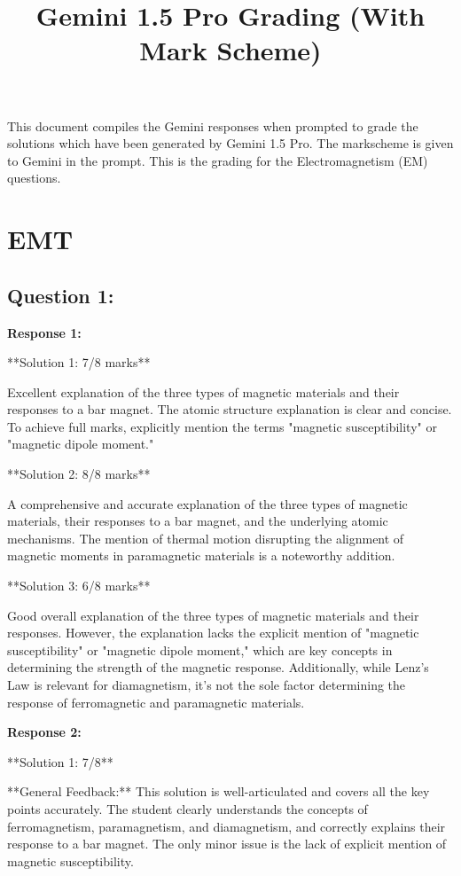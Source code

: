 \documentclass[a4paper,11pt]{article}
\begin{document}
    
\title{Gemini 1.5 Pro Grading (With Mark Scheme)}

\maketitle

This document compiles the Gemini responses when prompted to grade the solutions which have been generated by Gemini 1.5 Pro. The markscheme is given to Gemini in the prompt. This is the grading for the Electromagnetism (EM) questions. 

\section{EMT}

\subsection*{Question 1:}

\textbf{Response 1:}

**Solution 1: 7/8 marks**

Excellent explanation of the three types of magnetic materials and their responses to a bar magnet. The atomic structure explanation is clear and concise. To achieve full marks, explicitly mention the terms "magnetic susceptibility" or "magnetic dipole moment."

**Solution 2: 8/8 marks**

A comprehensive and accurate explanation of the three types of magnetic materials, their responses to a bar magnet, and the underlying atomic mechanisms. The mention of thermal motion disrupting the alignment of magnetic moments in paramagnetic materials is a noteworthy addition.

**Solution 3: 6/8 marks**

Good overall explanation of the three types of magnetic materials and their responses. However, the explanation lacks the explicit mention of "magnetic susceptibility" or "magnetic dipole moment," which are key concepts in determining the strength of the magnetic response. Additionally, while Lenz's Law is relevant for diamagnetism, it's not the sole factor determining the response of ferromagnetic and paramagnetic materials. 

\textbf{Response 2:}

**Solution 1: 7/8**

**General Feedback:** This solution is well-articulated and covers all the key points accurately. The student clearly understands the concepts of ferromagnetism, paramagnetism, and diamagnetism, and correctly explains their response to a bar magnet. The only minor issue is the lack of explicit mention of magnetic susceptibility.
\end{document}
